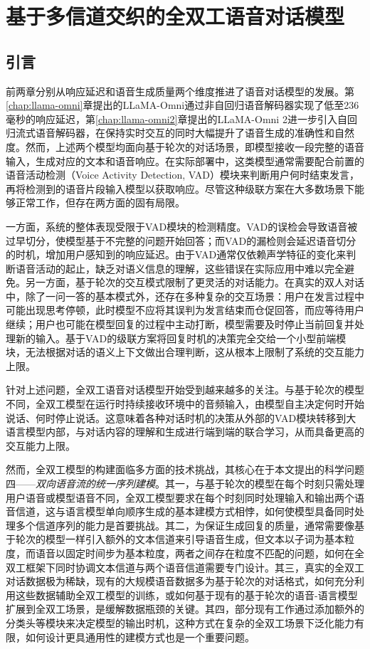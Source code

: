 \chapter{基于多信道交织的全双工语音对话模型}\label{chap:full-duplex}

\section{引言}

前两章分别从响应延迟和语音生成质量两个维度推进了语音对话模型的发展。第\ref{chap:llama-omni}章提出的LLaMA-Omni通过非自回归语音解码器实现了低至236毫秒的响应延迟，第\ref{chap:llama-omni2}章提出的LLaMA-Omni 2进一步引入自回归流式语音解码器，在保持实时交互的同时大幅提升了语音生成的准确性和自然度。然而，上述两个模型均面向基于轮次的对话场景，即模型接收一段完整的语音输入，生成对应的文本和语音响应。在实际部署中，这类模型通常需要配合前置的语音活动检测（Voice Activity Detection, VAD）模块来判断用户何时结束发言，再将检测到的语音片段输入模型以获取响应。尽管这种级联方案在大多数场景下能够正常工作，但存在两方面的固有局限。

一方面，系统的整体表现受限于VAD模块的检测精度。VAD的误检会导致语音被过早切分，使模型基于不完整的问题开始回答；而VAD的漏检则会延迟语音切分的时机，增加用户感知到的响应延迟。由于VAD通常仅依赖声学特征的变化来判断语音活动的起止，缺乏对语义信息的理解，这些错误在实际应用中难以完全避免。另一方面，基于轮次的交互模式限制了更灵活的对话能力。在真实的双人对话中，除了一问一答的基本模式外，还存在多种复杂的交互场景：用户在发言过程中可能出现思考停顿，此时模型不应将其误判为发言结束而仓促回答，而应等待用户继续；用户也可能在模型回复的过程中主动打断，模型需要及时停止当前回复并处理新的输入。基于VAD的级联方案将回复时机的决策完全交给一个小型前端模块，无法根据对话的语义上下文做出合理判断，这从根本上限制了系统的交互能力上限。

针对上述问题，全双工语音对话模型开始受到越来越多的关注。与基于轮次的模型不同，全双工模型在运行时持续接收环境中的音频输入，由模型自主决定何时开始说话、何时停止说话。这意味着各种对话时机的决策从外部的VAD模块转移到大语言模型内部，与对话内容的理解和生成进行端到端的联合学习，从而具备更高的交互能力上限。

然而，全双工模型的构建面临多方面的技术挑战，其核心在于本文提出的科学问题四——\textit{双向语音流的统一序列建模}。其一，与基于轮次的模型在每个时刻只需处理用户语音或模型语音不同，全双工模型要求在每个时刻同时处理输入和输出两个语音信道，这与语言模型单向顺序生成的基本建模方式相悖，如何使模型具备同时处理多个信道序列的能力是首要挑战。其二，为保证生成回复的质量，通常需要像基于轮次的模型一样引入额外的文本信道来引导语音生成，但文本以子词为基本粒度，而语音以固定时间步为基本粒度，两者之间存在粒度不匹配的问题，如何在全双工框架下同时协调文本信道与两个语音信道需要专门设计。其三，真实的全双工对话数据极为稀缺，现有的大规模语音数据多为基于轮次的对话格式，如何充分利用这些数据辅助全双工模型的训练，或如何基于现有的基于轮次的语音-语言模型扩展到全双工场景，是缓解数据瓶颈的关键。其四，部分现有工作通过添加额外的分类头等模块来决定模型的输出时机，这种方式在复杂的全双工场景下泛化能力有限，如何设计更具通用性的建模方式也是一个重要问题。


